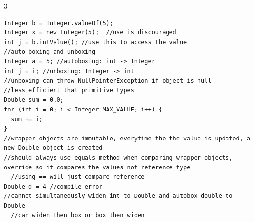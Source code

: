 \documentclass[10pt,a4paper]{article}
\begin{document}
\begin{multicols*}{3}
\begin{verbatim}
Integer b = Integer.valueOf(5);
Integer x = new Integer(5);  //use is discouraged
int j = b.intValue(); //use this to access the value
//auto boxing and unboxing
Integer a = 5; //autoboxing: int -> Integer
int j = i; //unboxing: Integer -> int
//unboxing can throw NullPointerException if object is null
//less efficient that primitive types
Double sum = 0.0;
for (int i = 0; i < Integer.MAX_VALUE; i++) {
  sum += i;
}
//wrapper objects are immutable, everytime the the value is updated, a new Double object is created
//should always use equals method when comparing wrapper objects, override so it compares the values not reference type
  //using == will just compare reference
Double d = 4 //compile error
//cannot simultaneously widen int to Double and autobox double to Double
  //can widen then box or box then widen
\end{verbatim}
\begin{verbatim}


\end{verbatim}
\end{multicols*}
\end{document}
